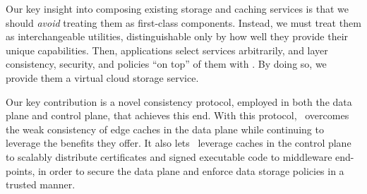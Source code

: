 Our key insight into composing existing storage and caching
services is that we should {\it avoid} treating them as
first-class components.  Instead, we must treat 
them as interchangeable utilities, distinguishable
only by how well they provide their unique capabilities.
Then, applications select services arbitrarily,
and layer consistency, security, 
and policies ``on top'' of them with \Syndicate.
By doing so, we provide them a virtual cloud storage
service.

Our key contribution is a novel consistency protocol, employed in both the data
plane and control plane, that achieves this end.  With this protocol,
\Syndicate\ overcomes the weak consistency of edge caches in the data plane
while continuing to leverage the benefits they offer.  It also 
lets \Syndicate\ leverage caches in the control plane to scalably distribute
certificates and signed executable code to middleware end-points,
in order to secure the data plane and enforce data storage policies in 
a trusted manner.
